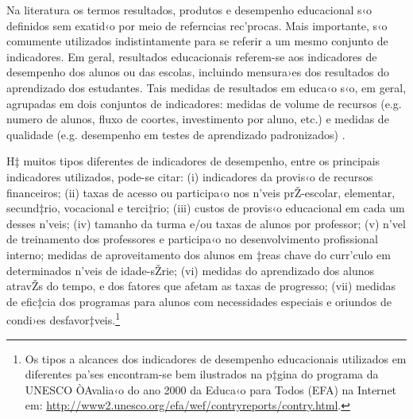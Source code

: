 \documentclass[a4paper, 12pt]{article}
\begin{document}
Na literatura os termos resultados, produtos e desempenho educacional s‹o definidos sem exatid‹o por meio de referncias rec’procas. Mais importante, s‹o comumente utilizados indistintamente para se referir a um mesmo conjunto de indicadores. Em geral, resultados educacionais referem-se aos indicadores de desempenho dos alunos ou das escolas, incluindo mensura›es dos resultados do aprendizado dos estudantes. Tais medidas de resultados em educa‹o s‹o, em geral, agrupadas em dois conjuntos de indicadores: medidas de volume de recursos (e.g. numero de alunos, fluxo de coortes, investimento por aluno, etc.) e medidas de qualidade (e.g. desempenho em testes de aprendizado padronizados) \cite{atkinson_measurement_2005-1}.

H‡ muitos tipos diferentes de indicadores de desempenho, entre os principais indicadores utilizados, pode-se citar: (i) indicadores da provis‹o de recursos financeiros; (ii) taxas de acesso ou participa‹o nos n’veis prŽ-escolar, elementar, secund‡rio, vocacional e terci‡rio; (iii) custos de provis‹o educacional em cada um desses n’veis; (iv) tamanho da turma e/ou taxas de alunos por professor; (v) n’vel de treinamento dos professores e participa‹o no desenvolvimento profissional interno; medidas de aproveitamento dos alunos em ‡reas chave do curr’culo em determinados n’veis de idade-sŽrie; (vi) medidas do aprendizado dos alunos atravŽs do tempo, e dos fatores que afetam as taxas de progresso; (vii) medidas de efic‡cia dos programas para alunos com necessidades especiais e oriundos de condi›es desfavor‡veis.\footnote{Os tipos a alcances dos indicadores de desempenho educacionais utilizados em diferentes pa’ses encontram-se bem ilustrados na p‡gina do programa da UNESCO ÒAvalia‹o do ano 2000 da Educa‹o para Todos (EFA) na Internet em: \url{http://www2.unesco.org/efa/wef/contryreports/contry.html}.}
\end{document}
